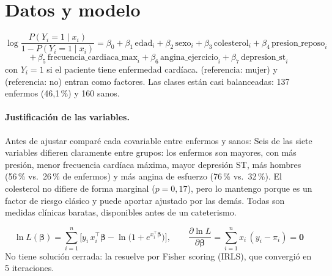 \section*{Datos y modelo}
\[
\log\frac{P(Y_i=1\mid x_i)}{1-P(Y_i=1\mid x_i)}=\beta_0+\beta_1\,\text{edad}_i+\beta_2\,\text{sexo}_i
+\beta_3\,\text{colesterol}_i+\beta_4\,\text{presion\_reposo}_i
\]
\[
+\,\beta_5\,\text{frecuencia\_cardiaca\_max}_i+\beta_6\,\text{angina\_ejercicio}_i+\beta_7\,\text{depresion\_st}_i
\]
con $Y_i=1$ si el paciente tiene enfermedad cardíaca.  (referencia: mujer) y
 (referencia: no) entran como factores.
Las clases están casi balanceadas: 137 enfermos (46,1\,\%) y 160 sanos.

\paragraph{Justificación de las variables.} Antes de ajustar comparé cada covariable entre enfermos y sanos:
Seis de las siete variables difieren claramente entre grupos: los enfermos son mayores, con más presión,
menor frecuencia cardíaca máxima, mayor depresión ST, más hombres (56\,\% vs.\ 26\,\% de enfermos) y más
angina de esfuerzo (76\,\% vs.\ 32\,\%). El colesterol no difiere de forma marginal ($p=0,17$), pero lo
mantengo porque es un factor de riesgo clásico y puede aportar ajustado por las demás. Todas son medidas
clínicas baratas, disponibles antes de un cateterismo.

\[
\ln L(\boldsymbol\beta)=\sum_{i=1}^{n}\Big[y_i\,x_i^\top\boldsymbol\beta-\ln\!\big(1+e^{x_i^\top\boldsymbol\beta}\big)\Big],
\qquad
\frac{\partial\ln L}{\partial\boldsymbol\beta}=\sum_{i=1}^{n}x_i\,(y_i-\pi_i)=\mathbf 0
\]
No tiene solución cerrada:  la resuelve por Fisher scoring (IRLS), que convergió en 5 iteraciones.


